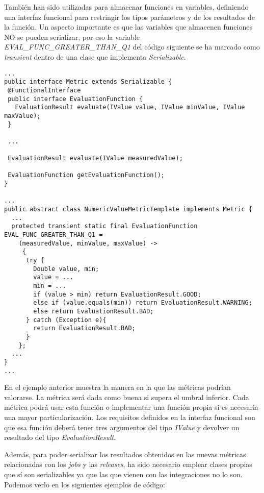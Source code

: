 También han sido utilizadas para almacenar funciones en variables, definiendo una interfaz funcional para restringir los tipos parámetros y de los resultados de la función. Un aspecto importante es que las variables que almacenen funciones NO se pueden serializar, por eso la variable \textit{EVAL\_FUNC\_GREATER\_THAN\_Q1} del código siguiente se ha marcado como \textit{transient} dentro de una clase que implementa \textit{Serializable}.

\begin{minipage}{\linewidth}
{\tiny
\begin{verbatim}
...
public interface Metric extends Serializable {
 @FunctionalInterface
 public interface EvaluationFunction {
   EvaluationResult evaluate(IValue value, IValue minValue, IValue maxValue);
 }

 ...
 
 EvaluationResult evaluate(IValue measuredValue);

 EvaluationFunction getEvaluationFunction();
}

...
public abstract class NumericValueMetricTemplate implements Metric {
  ...
  protected transient static final EvaluationFunction EVAL_FUNC_GREATER_THAN_Q1 = 
    (measuredValue, minValue, maxValue) -> 
     {
      try {
        Double value, min;
	    value = ...
	    min = ...
	    if (value > min) return EvaluationResult.GOOD;
	    else if (value.equals(min)) return EvaluationResult.WARNING;
	    else return EvaluationResult.BAD;
	  } catch (Exception e){
	    return EvaluationResult.BAD;
	  }
    };
  ...
}
...
\end{verbatim}
}
\end{minipage}

En el ejemplo anterior muestra la manera en la que las métricas podrían valorarse. La métrica será dada como buena si supera el umbral inferior. Cada métrica podrá usar esta función o implementar una función propia si es necesaria una mayor particularización. Los requisitos definidos en la interfaz funcional son que esa función deberá tener tres argumentos del tipo \textit{IValue} y devolver un resultado del tipo \textit{EvaluationResult}.


Además, para poder serializar los resultados obtenidos en las nuevas métricas relacionadas con los \textit{jobs} y las \textit{releases}, ha sido necesario emplear clases propias que sí son serializables ya que las que vienen con las integraciones no lo son. Podemos verlo en los siguientes ejemplos de código:

